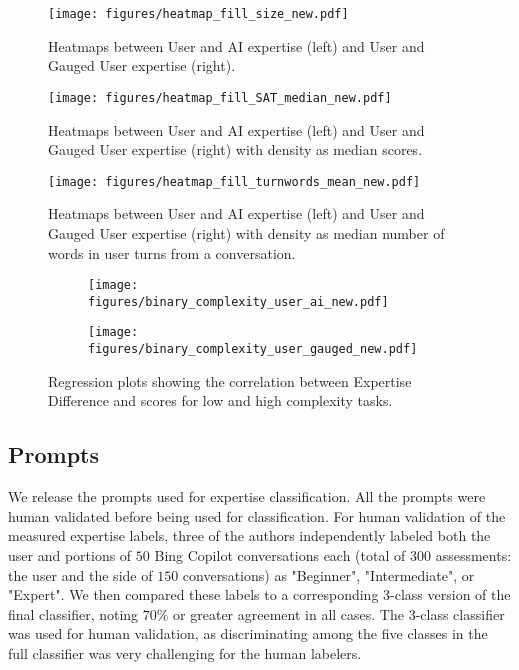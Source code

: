 \begin{figure*}[t!]
    \centering
    \texttt{[image: figures/heatmap\_fill\_size\_new.pdf]}
    \caption{Heatmaps between User and AI expertise (left) and User and Gauged User expertise (right).}\label{heatmap_size}
\end{figure*}

\begin{figure*}[t!]
    \centering
    \texttt{[image: figures/heatmap\_fill\_SAT\_median\_new.pdf]}
    \caption{Heatmaps between User and AI expertise (left) and User and Gauged User expertise (right) with density as median  scores.}\label{heatmap_sat}
\end{figure*}

\begin{figure*}[t!]
    \centering
    \texttt{[image: figures/heatmap\_fill\_turnwords\_mean\_new.pdf]}
    \caption{Heatmaps between User and AI expertise (left) and User and Gauged User expertise (right) with density as median number of words in user turns from a conversation.}\label{heatmap_turn_words}
\end{figure*}

\begin{figure*}[t!]
    \centering
    \begin{subfigure}[b]{0.49\linewidth}
        \texttt{[image: figures/binary\_complexity\_user\_ai\_new.pdf]}
        \caption{}
        \label{fig:binary_comp_user_ai}
    \end{subfigure}
    \begin{subfigure}[b]{0.49\linewidth}
        \texttt{[image: figures/binary\_complexity\_user\_gauged\_new.pdf]}
        \caption{}
        \label{fig:binary_comp_gauged}
    \end{subfigure}
    \caption{Regression plots showing the correlation between Expertise Difference and  scores for low and high complexity tasks.}
\end{figure*}

\subsection{Prompts}\label{prompt_details}
We release the prompts used for expertise classification. All the prompts were human validated before being used for classification. For human validation of the measured expertise labels, three of the authors independently labeled both the user and  portions of $50$ Bing Copilot conversations each (total of $300$ assessments: the user and the  side of $150$ conversations) as "Beginner", "Intermediate", or "Expert". We then compared these labels to a corresponding 3-class version of the final classifier, noting $70\%$ or greater agreement in all cases. The 3-class classifier was used for human validation, as discriminating among the five classes in the full classifier was very challenging for the human labelers.

